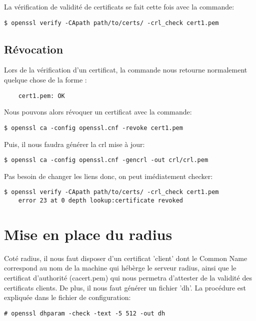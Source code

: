 La vérification de validité de certificats se fait cette fois avec la commande: 
\begin{verbatim}
$ openssl verify -CApath path/to/certs/ -crl_check cert1.pem
\end{verbatim}

\subsection{Révocation}
Lors de la vérification d'un certificat, la commande nous retourne normalement quelque chose de la forme : 
\begin{verbatim}
    cert1.pem: OK
\end{verbatim}
Nous pouvons alors révoquer un certificat avec la commande: 
\begin{verbatim}
$ openssl ca -config openssl.cnf -revoke cert1.pem
\end{verbatim}
Puis, il nous faudra générer la crl mise à jour: 
\begin{verbatim}
$ openssl ca -config openssl.cnf -gencrl -out crl/crl.pem
\end{verbatim}
Pas besoin de changer les liens donc, on peut imédiatement checker: 
\begin{verbatim}
$ openssl verify -CApath path/to/certs/ -crl_check cert1.pem
    error 23 at 0 depth lookup:certificate revoked
\end{verbatim}



\section{Mise en place du radius}

Coté radius, il nous faut disposer d'un certificat 'client' dont le Common Name correspond au nom de la machine qui hébèrge le serveur radius, ainsi que le certificat d'authorité (cacert.pem) qui nous permetra d'attester de la validité des certificats clients. 
De plus, il nous faut générer un fichier 'dh'. La procédure est expliquée dans le fichier de configuration: 
\begin{verbatim}
# openssl dhparam -check -text -5 512 -out dh
\end{verbatim}

